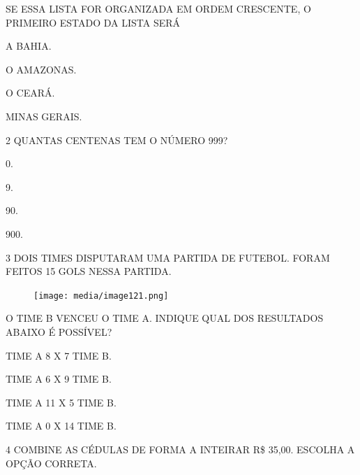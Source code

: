 SE ESSA LISTA FOR ORGANIZADA EM ORDEM CRESCENTE, O PRIMEIRO ESTADO DA LISTA SERÁ

\begin{multicols}{2}
\begin{escolha}%
\item A BAHIA.

\item O AMAZONAS.

\item O CEARÁ.

\item MINAS GERAIS.
\end{escolha}
\end{multicols}

\num{2} QUANTAS CENTENAS TEM O NÚMERO 999?

\begin{multicols}{2}
\begin{escolha}
\item 0.

\item 9.

\item 90.

\item 900.
\end{escolha}
\end{multicols}

\num{3} DOIS TIMES DISPUTARAM UMA PARTIDA DE FUTEBOL. FORAM FEITOS 15 GOLS NESSA
PARTIDA.

\begin{figure}[H]
\texttt{[image: media/image121.png]}
\end{figure}

O TIME B VENCEU O TIME A. INDIQUE QUAL DOS RESULTADOS ABAIXO É
POSSÍVEL?

\begin{escolha}[itemsep=0pt]
\item TIME A 8 X 7 TIME B.

\item TIME A 6 X 9 TIME B.

\item TIME A 11 X 5 TIME B.

\item TIME A 0 X 14 TIME B.
\end{escolha}

\pagebreak
\num{4} COMBINE AS CÉDULAS DE FORMA A INTEIRAR R\$ 35,00. ESCOLHA A OPÇÃO CORRETA.

